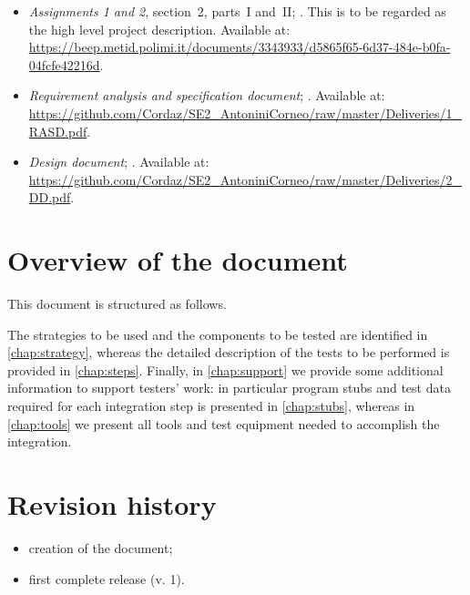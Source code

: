 \begin{itemize}
	\item \emph{Assignments 1 and 2}, section~2, parts~I and~II; . This is to be regarded as the high level project description. Available at: \url{https://beep.metid.polimi.it/documents/3343933/d5865f65-6d37-484e-b0fa-04fcfe42216d}.
	
	\item \emph{Requirement analysis and specification document}; . Available at: \url{https://github.com/Cordaz/SE2_AntoniniCorneo/raw/master/Deliveries/1_RASD.pdf}.
	
	\item \emph{Design document}; . Available at: \url{https://github.com/Cordaz/SE2_AntoniniCorneo/raw/master/Deliveries/2_DD.pdf}.
\end{itemize}





\section{Overview of the document} 
This document is structured as follows. 

The strategies to be used and the components to be tested are identified in \cref{chap:strategy}, whereas the detailed description of the tests to be performed is provided in \cref{chap:steps}. Finally, in \cref{chap:support} we provide some additional information to support testers' work: in particular program stubs and test data required for each integration step is presented in \cref{chap:stubs}, whereas in \cref{chap:tools} we present all tools and test equipment needed to accomplish the integration.



\section{Revision history}
\begin{itemize}
	\item {} creation of the document;
	\item {} first complete release (v. 1).
\end{itemize}




